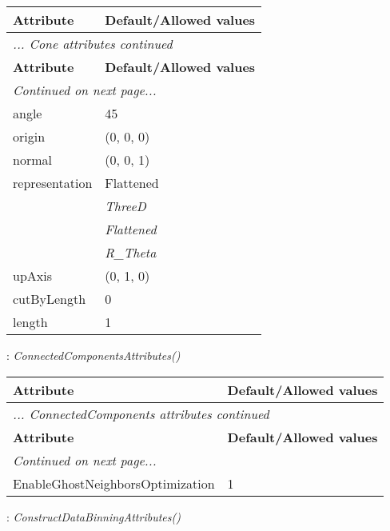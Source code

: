 \documentclass[10pt,a4paper]{report}
\begin{document}
\begin{longtable}{ll}
{\bf Attribute} & {\bf Default/Allowed values} \\
\hline \hline
\endfirsthead
\multicolumn{2}{l}{{\it ... Cone attributes continued}} \\
{\bf Attribute} & {\bf Default/Allowed values} \\
\hline \hline
\endhead
\hline
\multicolumn{2}{l}{{\it Continued on next page...}} \\
\endfoot
\hline
\endlastfoot

angle  &  45 \\
origin  &  (0, 0, 0) \\
normal  &  (0, 0, 1) \\
representation  &  Flattened   \\
 & {\it  ThreeD} \\
 & {\it  Flattened} \\
 & {\it  R\_Theta} \\
upAxis  &  (0, 1, 0) \\
cutByLength  &  0 \\
length  &  1 \\
\end{longtable}

\newpage

{}
: {\it ConnectedComponentsAttributes() }\\[-3mm]

\begin{longtable}{ll}
{\bf Attribute} & {\bf Default/Allowed values} \\
\hline \hline
\endfirsthead
\multicolumn{2}{l}{{\it ... ConnectedComponents attributes continued}} \\
{\bf Attribute} & {\bf Default/Allowed values} \\
\hline \hline
\endhead
\hline
\multicolumn{2}{l}{{\it Continued on next page...}} \\
\endfoot
\hline
\endlastfoot

EnableGhostNeighborsOptimization  &  1 \\
\end{longtable}

\newpage

{}
: {\it ConstructDataBinningAttributes() }\\[-3mm]
\end{document}

